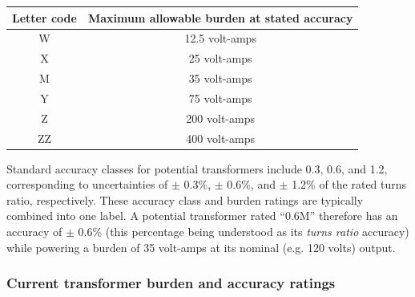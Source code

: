 \begin{center}
\begin{tabular}{| c | c |}
\hline 
\textbf{Letter code} & \textbf{Maximum allowable burden at stated accuracy} \\[3pt] \hline
W & 12.5 volt-amps \\[3pt] \hline 
X & 25 volt-amps \\[3pt] \hline 
M & 35 volt-amps \\[3pt] \hline 
Y & 75 volt-amps \\[3pt] \hline 
Z & 200 volt-amps \\[3pt] \hline 
ZZ & 400 volt-amps \\[3pt] \hline 
\end{tabular}
\end{center}

Standard accuracy classes for potential transformers include 0.3, 0.6, and 1.2, corresponding to uncertainties of $\pm$ 0.3\%, $\pm$ 0.6\%, and $\pm$ 1.2\% of the rated turns ratio, respectively.  These accuracy class and burden ratings are typically combined into one label.  A potential transformer rated ``0.6M'' therefore has an accuracy of $\pm$ 0.6\% (this percentage being understood as its \textit{turns ratio} accuracy) while powering a burden of 35 volt-amps at its nominal (e.g. 120 volts) output.








\filbreak
\subsubsection{Current transformer burden and accuracy ratings}

